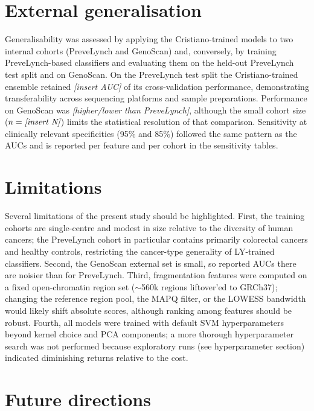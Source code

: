 \section{External generalisation}

Generalisability was assessed by applying the Cristiano-trained models to two
internal cohorts (PreveLynch and GenoScan) and, conversely, by training
PreveLynch-based classifiers and evaluating them on the held-out PreveLynch
test split and on GenoScan. On the PreveLynch test split the
Cristiano-trained ensemble retained \emph{[insert AUC]} of its cross-validation
performance, demonstrating transferability across sequencing platforms and
sample preparations. Performance on GenoScan was \emph{[higher/lower than
PreveLynch]}, although the small cohort size (\(n=\emph{[insert N]}\))
limits the statistical resolution of that comparison. Sensitivity at
clinically relevant specificities (95\% and 85\%) followed the same
pattern as the AUCs and is reported per feature and per cohort in the
sensitivity tables.

\section{Limitations}

Several limitations of the present study should be highlighted. First, the
training cohorts are single-centre and modest in size relative to the
diversity of human cancers; the PreveLynch cohort in particular contains
primarily colorectal cancers and healthy controls, restricting the
cancer-type generality of LY-trained classifiers. Second, the GenoScan
external set is small, so reported AUCs there are noisier than for
PreveLynch. Third, fragmentation features were computed on a fixed open-chromatin
region set (\(\sim\)560k regions liftover'ed to GRCh37); changing the
reference region pool, the MAPQ filter, or the LOWESS bandwidth would
likely shift absolute scores, although ranking among features should be
robust. Fourth, all models were trained with default SVM hyperparameters
beyond kernel choice and PCA components; a more thorough hyperparameter
search was not performed because exploratory runs (see hyperparameter
section) indicated diminishing returns relative to the cost.

\section{Future directions}

